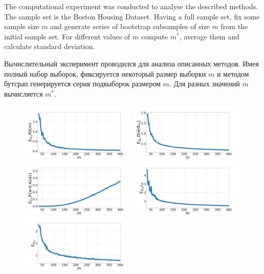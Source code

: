 The computational experiment was conducted to analyse the described methods. The sample set is the Boston Housing Dataset. Having a full sample set, fix some sample size $m$ and generate series of bootstrap subsamples of size $m$ from the initial sample set. For different values of $m$ compute $m^*$, average them and calculate standard deviation. 

Вычислительный эксперимент проводился для анализа описанных методов. Имея полный набор выборок, фиксируется некоторый размер выборки $m$ и методом бутсрап генерируется серия подвыборок размером $m$. Для разных значений $m$ вычисляется $m^*$.
    
\begin{figure}[h!t]\center
    \includegraphics[width=0.49\textwidth]{results/samplesize/cross.pdf}
    \includegraphics[width=0.49\textwidth]{results/samplesize/apvc.pdf}\\
    \includegraphics[width=0.49\textwidth]{results/samplesize/acc.pdf}
    \includegraphics[width=0.49\textwidth]{results/samplesize/alc.pdf}\\
    \includegraphics[width=0.49\textwidth]{results/samplesize/bootstrap.pdf}

\end{figure}
